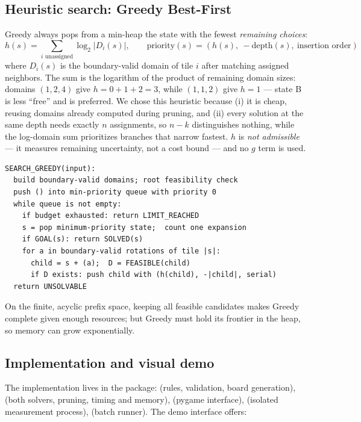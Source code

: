 \subsection{Heuristic search: Greedy Best-First}

Greedy always pops from a min-heap the state with the fewest \emph{remaining
choices}:
\[
h(s) = \sum_{i \text{ unassigned}} \log_2 |D_i(s)|, \qquad
\text{priority}(s) = (h(s),\ -\text{depth}(s),\ \text{insertion order})
\]
where $D_i(s)$ is the boundary-valid domain of tile $i$ after matching assigned
neighbors. The sum is the logarithm of the product of remaining domain sizes:
domains $(1,2,4)$ give $h=0+1+2=3$, while $(1,1,2)$ give $h=1$ --- state B is
less ``free'' and is preferred. We chose this heuristic because (i) it is cheap,
reusing domains already computed during pruning, and (ii) every solution at the
same depth needs exactly $n$ assignments, so $n-k$ distinguishes nothing, while
the log-domain sum prioritizes branches that narrow fastest. $h$ is
\emph{not admissible} --- it measures remaining uncertainty, not a cost bound ---
and no $g$ term is used.

\begin{lstlisting}
SEARCH_GREEDY(input):
  build boundary-valid domains; root feasibility check
  push () into min-priority queue with priority 0
  while queue is not empty:
    if budget exhausted: return LIMIT_REACHED
    s = pop minimum-priority state;  count one expansion
    if GOAL(s): return SOLVED(s)
    for a in boundary-valid rotations of tile |s|:
      child = s + (a);  D = FEASIBLE(child)
      if D exists: push child with (h(child), -|child|, serial)
  return UNSOLVABLE
\end{lstlisting}

On the finite, acyclic prefix space, keeping all feasible candidates makes Greedy
complete given enough resources; but Greedy must hold its frontier in the heap,
so memory can grow exponentially.

\subsection{Implementation and visual demo}

The implementation lives in the  package: 
(rules, validation, board generation),  (both solvers, pruning,
timing and memory),  (pygame interface),  (isolated
measurement process),  (batch runner). The demo interface
offers:

